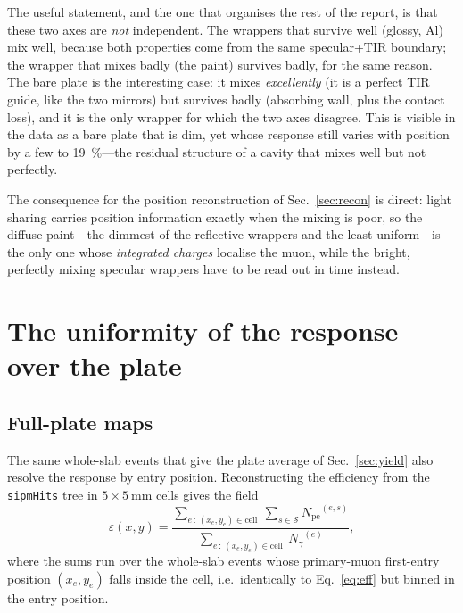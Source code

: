 \documentclass[11pt,a4paper]{article}
\newcommand{\pe}{\ensuremath{N_{\mathrm{pe}}}}
\newcommand{\ngam}{\ensuremath{N_{\gamma}}}
\begin{document}
The useful statement, and the one that organises the rest of the report, is
that these two axes are \emph{not} independent. The wrappers that survive
well (glossy, Al) mix well, because both properties come from the same
specular+TIR boundary; the wrapper that mixes badly (the paint) survives
badly, for the same reason. The bare plate is the interesting case: it mixes
\emph{excellently} (it is a perfect TIR guide, like the two mirrors) but
survives badly (absorbing wall, plus the contact loss), and it is the only
wrapper for which the two axes disagree. This is visible in the data as a bare plate that is
dim, yet whose response still varies with position by a few to
\SI{19}{\percent}---the residual structure of a cavity that mixes well but
not perfectly.

The consequence for the position reconstruction of Sec.~\ref{sec:recon} is
direct: light sharing carries position information exactly when the mixing is
poor, so the diffuse paint---the dimmest of the reflective wrappers and the
least uniform---is the only one whose \emph{integrated charges} localise the
muon, while the bright, perfectly mixing specular wrappers have to be read out
in time instead.
\section{The uniformity of the response over the plate}
\label{sec:uniformity}

\subsection{Full-plate maps}

The same whole-slab events that give the plate average of
Sec.~\ref{sec:yield} also resolve the response by entry position.
Reconstructing the efficiency from the
\texttt{sipmHits} tree in $5 \times \SI{5}{\milli\meter}$ cells gives the field
\begin{equation}
  \varepsilon(x,y) = \frac{\sum_{e\,:\,(x_e,y_e)\in\text{cell}}\ \sum_{s\in\mathcal{S}} \pe^{(e,s)}}
                          {\sum_{e\,:\,(x_e,y_e)\in\text{cell}}\ \ngam^{(e)}},
\end{equation}
where the sums run over the whole-slab events whose primary-muon first-entry
position $(x_e,y_e)$ falls inside the cell, i.e.\ identically to
Eq.~\ref{eq:eff} but binned in the entry position.
\end{document}
